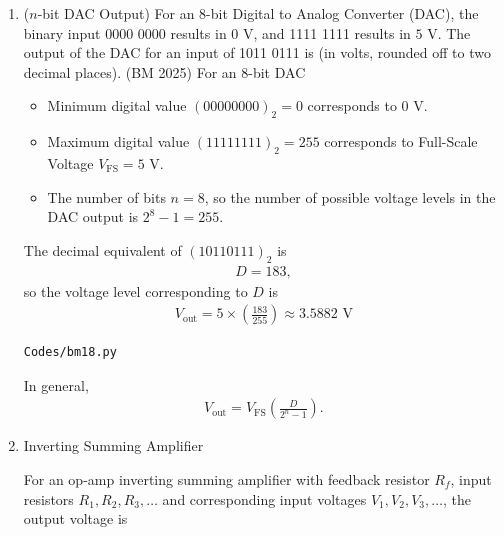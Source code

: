 \begin{enumerate}[label=\thesubsection.\arabic*,ref=\thesubsection.\theenumi]
\item 
	($n$-bit DAC Output)
	For an 8-bit Digital to Analog Converter (DAC), the binary input 0000 0000 results in $0\text{ V}$, and 1111 1111 results in $5\text{ V}$. The output of the DAC for an input of 1011 0111 is \underline{\hspace{2cm}} (in volts, rounded off to two decimal places).
\hfill  (BM 2025)
\solution
For an 8-bit DAC
\begin{itemize}
    \item Minimum digital value $(00000000)_2 = 0$ corresponds to $0\text{ V}$.
    \item Maximum digital value $(11111111)_2 = 255$ corresponds to Full-Scale Voltage $V_{\text{FS}} = 5\text{ V}$.
    \item The number of bits
$n = 8$, so the number of possible voltage levels in the DAC output is $2^8 - 1 = 255$.
\end{itemize}
The decimal equivalent of $(10110111)_2$ is
\begin{align}
D= 183,
\end{align}
so the voltage level corresponding to $D$ is 
\begin{align}
V_{\text{out}} = 5 \times \left( \frac{183}{255} \right)
 \approx 3.5882\text{ V}
\end{align}
\begin{lstlisting}
Codes/bm18.py
\end{lstlisting}
In general,
\begin{align}
V_{\text{out}}=V_{\text{FS}}\left(\frac{D}{2^{n}-1}\right). \label{output}
\end{align}
\item Inverting Summing Amplifier

For an op-amp inverting summing amplifier with feedback resistor
$R_f$, input resistors $R_1,R_2,R_3,\dots$ and corresponding input
voltages $V_1,V_2,V_3,\dots$, the output voltage is

\begin{center}
\begin{tikzpicture}[
    resistor/.style={
        circuitikz/resistor style/.style={},
        decorate, 
        decoration={zigzag, segment length=6pt, amplitude=3pt, pre length=6pt, post length=6pt}
    },
    terminal/.style={circle, draw, inner sep=1.5pt, fill=white},
    dot/.style={circle, fill, inner sep=1.2pt}
]


\end{tikzpicture}
\end{center}
\end{enumerate}
